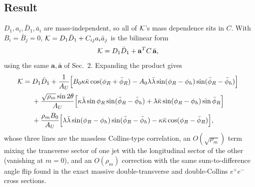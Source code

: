 \documentclass[10pt]{article}
\begin{document}
\subsection*{Result}

\(D_1,a_i,\bar D_1,\bar a_i\) are mass-independent, so all of
\({\cal K}\)'s mass dependence sits in \(C\).  With \(B_i=\bar B_j=0\),
\({\cal K}=D_1\bar D_1+C_{ij}a_i\bar a_j\) is the bilinear form
\[
{\cal K}=D_1\bar D_1+\mathbf a^T C\,\bar{\mathbf a} ,
\]
using the same \(\mathbf a,\bar{\mathbf a}\) of Sec.~2.  Expanding the
product gives
\[
\begin{aligned}
{\cal K}={}&D_1\bar D_1
+\frac1{A_U}\Big[
B_0\kappa\bar\kappa\cos(\phi_R+\bar\phi_R)
-A_0\lambda\bar\lambda\sin(\phi_R-\phi_h)\sin(\bar\phi_R-\bar\phi_h)
\Big]
\\[2pt]
&+\frac{\sqrt{\rho_m}\sin2\theta}{A_U}\Big[
\kappa\bar\lambda\sin\phi_R\sin(\bar\phi_R-\bar\phi_h)
+\lambda\bar\kappa\sin(\phi_R-\phi_h)\sin\bar\phi_R
\Big]
\\[2pt]
&+\frac{\rho_mB_0}{A_U}\Big[
\lambda\bar\lambda\sin(\phi_R-\phi_h)\sin(\bar\phi_R-\bar\phi_h)
-\kappa\bar\kappa\cos(\phi_R-\bar\phi_R)
\Big] ,
\end{aligned}
\]
whose three lines are the massless Collins-type correlation, an
\(O(\sqrt{\rho_m})\) term mixing the transverse sector of one jet with
the longitudinal sector of the other (vanishing at \(m=0\)), and an
\(O(\rho_m)\) correction with the same sum-to-difference angle flip
found in the exact massive double-transverse and double-Collins
\(e^+e^-\) cross sections.
\end{document}

